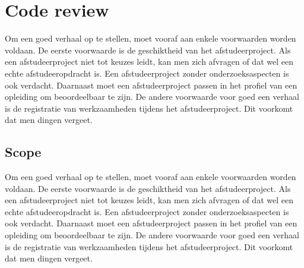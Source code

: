 %			
%			
%				
			
			
			\chapter{Code review}
			
			Om een goed verhaal op te stellen, moet vooraf aan enkele voorwaarden
			worden voldaan. De eerste voorwaarde is de geschiktheid van het
			afstudeerproject. Als een afstudeerproject niet tot keuzes leidt, kan
			men zich afvragen of dat wel een echte afstudeeropdracht is. Een
			afstudeerproject zonder onderzoeksaspecten is ook verdacht. Daarnaast
			moet een afstudeerproject passen in het profiel van een opleiding om
			beoordeelbaar te zijn. De andere voorwaarde voor goed een verhaal is
			de registratie van werkzaamheden tijdens het afstudeerproject. Dit
			voorkomt dat men dingen vergeet.
			\section{Scope}
			
			Om een goed verhaal op te stellen, moet vooraf aan enkele voorwaarden
			worden voldaan. De eerste voorwaarde is de geschiktheid van het
			afstudeerproject. Als een afstudeerproject niet tot keuzes leidt, kan
			men zich afvragen of dat wel een echte afstudeeropdracht is. Een
			afstudeerproject zonder onderzoeksaspecten is ook verdacht. Daarnaast
			moet een afstudeerproject passen in het profiel van een opleiding om
			beoordeelbaar te zijn. De andere voorwaarde voor goed een verhaal is
			de registratie van werkzaamheden tijdens het afstudeerproject. Dit
			voorkomt dat men dingen vergeet.

